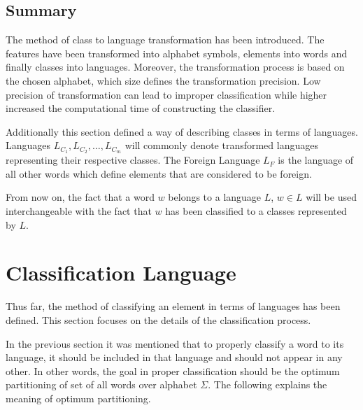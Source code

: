 \documentclass{mini}
\begin{document}
\subsection{Summary}\label{sec:lan_theory_transf_summary}
The method of class to language transformation has been introduced. The features have been transformed into alphabet symbols, elements into words and finally classes into languages. Moreover, the transformation process is based on the chosen alphabet, which size defines the transformation precision. Low precision of transformation can lead to improper classification while higher increased the computational time of constructing the classifier.

Additionally this section defined a way of describing classes in terms of languages. Languages $L_{C_1},L_{C_2},\ldots,L_{C_m}$ will commonly denote transformed languages representing their respective classes. The Foreign Language $L_{F}$ is the language of all other words which define elements that are considered to be foreign.

From now on, the fact that a word $w$ belongs to a language $L$, $w\in L$ will be used interchangeable with the fact that $w$ has been classified to a classes represented by $L$.

\section{Classification Language}\label{sec:lan_theory_class_lan}
Thus far, the method of classifying an element in terms of languages has been defined. This section focuses on the details of the classification process.

In the previous section it was mentioned that to properly classify a word to its language, it should be included in that language and should not appear in any other. In other words, the goal in proper classification should be the optimum partitioning of set of all words over alphabet $\Sigma$. The following explains the meaning of optimum partitioning.

\end{document}
